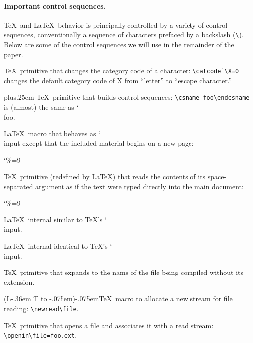 \documentclass[nofontenc,pagenumbers,letterpaper,tight,twocolumn]{usenix09}
\makeatletter
\newcommand*\La%
   {L\kern-.36em
        {\setbox0\hbox{T}%
         \vbox to\ht0{\hbox{$\m@th$%
                            \csname S@\f@size\endcsname
                            \fontsize\sf@size\z@
                            \math@fontsfalse\selectfont
                            A}%
                      \vss}%
        }}
\newcommand*\AllTeX{(\La\kern-.075em)\kern-.075em\TeX}
\DeclareRobustCommand*\cs[1]{{\csfont\char`\\#1}}
\newcommand\csfont{\ttfamily\small}
\makeatother
\begin{document}
\paragraph{Important control sequences.}
\TeX\ and \LaTeX\ behavior is principally controlled by a variety
of control sequences, conventionally a sequence of characters prefaced
by a backslash (\verb^\^).
Below are some of the control sequences we will use in the remainder
of the paper.
\begin{description}[nolistsep]
\item[\cs{catcode}] \TeX\ primitive that changes the category code of
a character: \lstinline!\catcode`\X=0! changes the default category
code of X from ``letter'' to ``escape character.''

\item[\cs{csname}\,\,\ldots\cs{endcsname}]\hskip0pt plus.25em \TeX\ primitive that
builds control sequences:
\lstinline!\csname foo\endcsname! is (almost) the same as
\cs{foo}.

\item[\cs{include}] \LaTeX\ macro that behaves as \cs{input} except
that the included material begins on a new page:
{\catcode`\%=9

\item[\cs{input}] \TeX\ primitive (redefined by \LaTeX) that reads the
contents of its space-separated argument as if the text were typed
directly into the main document:
{\catcode`\%=9

\item[\cs{@input}] \LaTeX\ internal similar to \TeX's \cs{input}.

\item[\cs{@@input}] \LaTeX\ internal identical to \TeX's \cs{input}.

\item[\cs{jobname}] \TeX\ primitive that expands to the name of the
file being compiled without its extension.

\item[\cs{newread}] \AllTeX\ macro to allocate a new stream for file
reading:
\lstinline!\newread\file!.

\item[\cs{openin}] \TeX\ primitive that opens a file and
associates it with a read stream: \lstinline!\openin\file=foo.ext!.

}}
\end{description}
\end{document}
